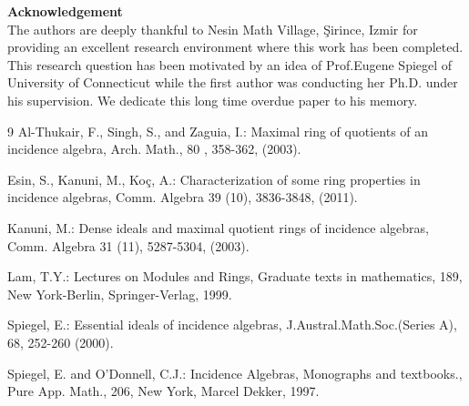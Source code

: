 \documentclass[12pt]{article}
\newtheorem{acknowledgement}[theorem]{Acknowledgement}
\begin{document}
{\bf Acknowledgement} \\
The authors are deeply thankful to Nesin Math Village, \c{S}irince, Izmir for providing an excellent research environment where this work has been completed. This research question has been motivated by an idea of Prof.Eugene Spiegel of University of Connecticut while the first author was conducting her Ph.D. under his supervision. We dedicate this long time overdue paper to his memory. 

%
%

\begin{thebibliography}{9}
 Al-Thukair, F., Singh, S., and Zaguia, I.:
Maximal ring of quotients of an incidence algebra, Arch. Math., 80 ,
358-362, (2003).

 Esin, S., Kanuni, M., Ko\c{c}, A.:
Characterization of some ring properties in incidence algebras, Comm.
Algebra 39 (10), 3836-3848, (2011).

 Kanuni, M.: Dense ideals and maximal quotient rings of
incidence algebras, Comm. Algebra 31 (11), 5287-5304, (2003).


 Lam, T.Y.: Lectures on Modules and Rings, Graduate
texts in mathematics, 189, New York-Berlin, Springer-Verlag, 1999.

 Spiegel, E.: Essential ideals of incidence algebras,
J.Austral.Math.Soc.(Series A), 68, 252-260 (2000).

 Spiegel, E. and O'Donnell, C.J.: Incidence Algebras,
Monographs and textbooks., Pure App. Math., 206, New York, Marcel Dekker,
1997.

\end{thebibliography}
\end{document}
